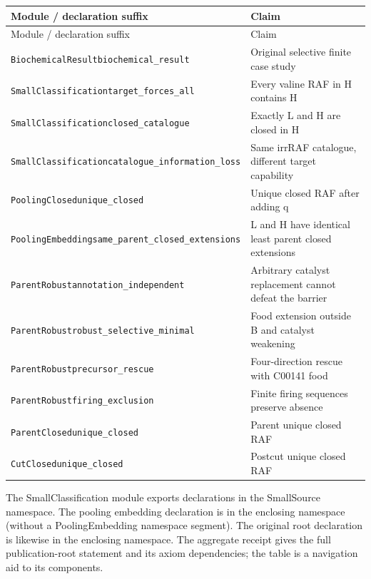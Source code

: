 \documentclass[10pt]{article}
\begin{document}
\begin{longtable}{>{\raggedright\arraybackslash}p{.49\linewidth}>{\raggedright\arraybackslash}p{.43\linewidth}}
\toprule Module / declaration suffix & Claim\\\midrule
\endfirsthead\toprule Module / declaration suffix & Claim\\\midrule
\endhead
\texttt{BiochemicalResult}\newline \texttt{biochemical\_\allowbreak result} & Original selective finite case study\\
\texttt{SmallClassification}\newline \texttt{target\_\allowbreak forces\_\allowbreak all} & Every valine RAF in H contains H\\
\texttt{SmallClassification}\newline \texttt{closed\_\allowbreak catalogue} & Exactly L and H are closed in H\\
\texttt{SmallClassification}\newline \texttt{catalogue\_\allowbreak information\_\allowbreak loss} & Same irrRAF catalogue, different target capability\\
\texttt{PoolingClosed}\newline \texttt{unique\_\allowbreak closed} & Unique closed RAF after adding q\\
\texttt{PoolingEmbedding}\newline \texttt{same\_\allowbreak parent\_\allowbreak closed\_\allowbreak extensions} & L and H have identical least parent closed extensions\\
\texttt{ParentRobust}\newline \texttt{annotation\_\allowbreak independent} & Arbitrary catalyst replacement cannot defeat the barrier\\
\texttt{ParentRobust}\newline \texttt{robust\_\allowbreak selective\_\allowbreak minimal} & Food extension outside B and catalyst weakening\\
\texttt{ParentRobust}\newline \texttt{precursor\_\allowbreak rescue} & Four-direction rescue with C00141 food\\
\texttt{ParentRobust}\newline \texttt{firing\_\allowbreak exclusion} & Finite firing sequences preserve absence\\
\texttt{ParentClosed}\newline \texttt{unique\_\allowbreak closed} & Parent unique closed RAF\\
\texttt{CutClosed}\newline \texttt{unique\_\allowbreak closed} & Postcut unique closed RAF\\
\bottomrule\end{longtable}
The SmallClassification module exports declarations in the SmallSource namespace. The pooling embedding declaration is in the enclosing namespace (without a PoolingEmbedding namespace segment). The original root declaration is likewise in the enclosing namespace. The aggregate receipt gives the full publication-root statement and its axiom dependencies; the table is a navigation aid to its components.
\end{document}
